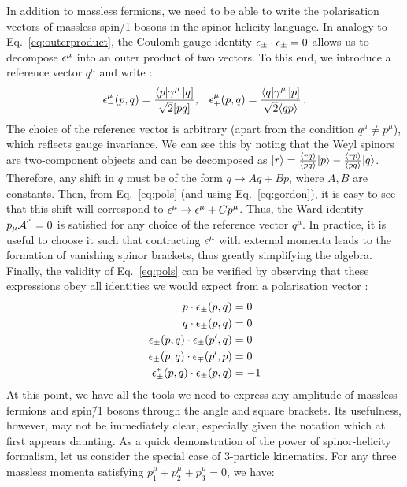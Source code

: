 \documentclass[main.tex]{subfiles}
\begin{document}
In addition to massless fermions, we need to be able to write the polarisation vectors of massless spin\=/1 bosons in the spinor-helicity language. In analogy to Eq.~\ref{eq:outerproduct}, the Coulomb gauge identity $\epsilon_{\pm} \cdot \epsilon_{\pm} = 0$  allows us to decompose $\epsilon^\mu$ into an outer product of two vectors. To this end, we introduce a reference vector $q^\mu$ and write :
\begin{align} \label{eq:pols}
    \epsilon^\mu_{-}(p, q) = \frac{\langle p|\gamma^\mu\left| q \right]}{\sqrt{2}[ pq ]}, && \epsilon^\mu_{+}(p, q) = \frac{\langle q|\gamma^\mu\left| p \right]}{\sqrt{2}\langle qp \rangle} \,.
\end{align}
The choice of the reference vector is arbitrary (apart from the condition $q^\mu \neq p^\mu$), which reflects gauge invariance. We can see this by noting that the Weyl spinors are two-component objects and can be decomposed as $|r \rangle = \frac{\langle rq \rangle}{\langle pq \rangle}|p \rangle - \frac{\langle rp \rangle}{\langle pq \rangle}|q \rangle$. Therefore, any shift in $q$ must be of the form $q \rightarrow Aq + Bp$, where $A, B$ are constants. Then, from Eq.~\ref{eq:pols} (and using Eq.~\ref{eq:gordon}), it is easy to see that this shift will correspond to $\epsilon^\mu \rightarrow \epsilon^\mu + Cp^\mu$. Thus, the Ward identity $p_\mu \mathcal{A}_{}^{^\mu}=0$ is satisfied for any choice of the reference vector $q^\mu$. In practice, it is useful to choose it such that contracting $\epsilon^\mu$ with external momenta leads to the formation of vanishing spinor brackets, thus greatly simplifying the algebra. Finally, the validity of Eq.~\ref{eq:pols} can be verified by observing that these expressions obey all identities we would expect from a polarisation vector :
\begin{subequations}
    \begin{align}
        p \cdot \epsilon_\pm(p, q) &= 0 \\
        q \cdot \epsilon_\pm(p, q) &= 0 \\
        \epsilon_\pm (p, q) \cdot \epsilon_\pm(p', q) &= 0 \\
        \epsilon_\pm (p, q) \cdot \epsilon_\mp(p', p) &= 0 \\
        \epsilon_\pm^\ast (p, q) \cdot \epsilon_\pm(p, q) &= -1
    \end{align}
\end{subequations}
At this point, we have all the tools we need to express any amplitude of massless fermions and spin\=/1 bosons through the angle and square brackets. Its usefulness, however, may not be immediately clear, especially given the notation which at first appears daunting. As a quick demonstration of the power of spinor-helicity formalism, let us consider the special case of 3-particle kinematics. For any three massless momenta satisfying $p_1^\mu + p_2^\mu + p_3^\mu = 0$, we have:
\end{document}
